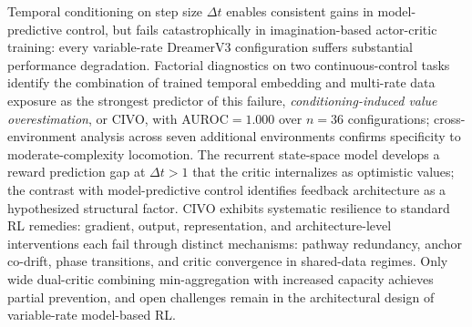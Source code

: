  Temporal conditioning on step size $\Delta t$ enables consistent gains in model-predictive control, but fails catastrophically in imagination-based actor-critic training: every variable-rate DreamerV3 configuration suffers substantial performance degradation. Factorial diagnostics on two continuous-control tasks identify the combination of trained temporal embedding and multi-rate data exposure as the strongest predictor of this failure, \emph{conditioning-induced value overestimation}, or CIVO, with AUROC${=}1.000$ over $n{=}36$ configurations; cross-environment analysis across seven additional environments confirms specificity to moderate-complexity locomotion. The recurrent state-space model develops a reward prediction gap at $\Delta t{>}1$ that the critic internalizes as optimistic values; the contrast with model-predictive control identifies feedback architecture as a hypothesized structural factor. CIVO exhibits systematic resilience to standard RL remedies: gradient, output, representation, and architecture-level interventions each fail through distinct mechanisms: pathway redundancy, anchor co-drift, phase transitions, and critic convergence in shared-data regimes. Only wide dual-critic combining min-aggregation with increased capacity achieves partial prevention, and open challenges remain in the architectural design of variable-rate model-based RL.
